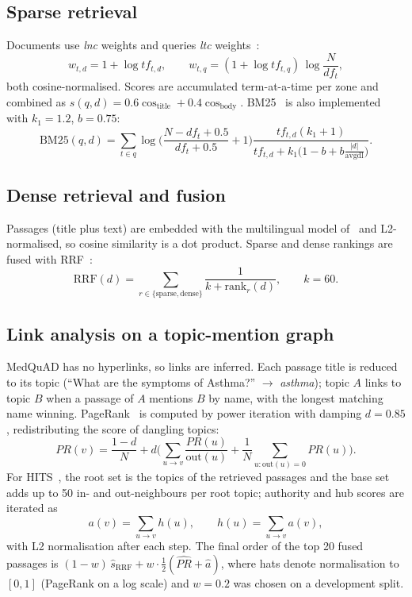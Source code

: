 \documentclass[conference]{IEEEtran}
\begin{document}
\subsection{Sparse retrieval}
Documents use \textit{lnc} weights and queries \textit{ltc} weights~\cite{manning2008}:
\begin{equation}
w_{t,d} = 1+\log tf_{t,d}, \qquad w_{t,q} = (1+\log tf_{t,q})\,\log\frac{N}{df_t},
\end{equation}
both cosine-normalised. Scores are accumulated term-at-a-time per zone and combined as $s(q,d)=0.6\cos_{\text{title}}+0.4\cos_{\text{body}}$. BM25~\cite{robertson2009} is also implemented with $k_1=1.2$, $b=0.75$:
\begin{equation}
\text{BM25}(q,d)=\sum_{t\in q}\log\!\Big(\frac{N-df_t+0.5}{df_t+0.5}+1\Big)\frac{tf_{t,d}(k_1+1)}{tf_{t,d}+k_1\big(1-b+b\frac{|d|}{\text{avgdl}}\big)}.
\end{equation}

\subsection{Dense retrieval and fusion}
Passages (title plus text) are embedded with the multilingual model of~\cite{reimers2020} and L2-normalised, so cosine similarity is a dot product. Sparse and dense rankings are fused with RRF~\cite{cormack2009}:
\begin{equation}
\text{RRF}(d)=\sum_{r\in\{\text{sparse},\text{dense}\}}\frac{1}{k+\text{rank}_r(d)},\qquad k=60.
\end{equation}

\subsection{Link analysis on a topic-mention graph}
MedQuAD has no hyperlinks, so links are inferred. Each passage title is reduced to its topic (``What are the symptoms of Asthma?'' $\to$ \textit{asthma}); topic $A$ links to topic $B$ when a passage of $A$ mentions $B$ by name, with the longest matching name winning. PageRank~\cite{page1999} is computed by power iteration with damping $d=0.85$, redistributing the score of dangling topics:
\begin{equation}
PR(v)=\frac{1-d}{N}+d\Big(\sum_{u\to v}\frac{PR(u)}{\text{out}(u)}+\frac{1}{N}\sum_{u:\text{out}(u)=0}PR(u)\Big).
\end{equation}
For HITS~\cite{kleinberg1999}, the root set is the topics of the retrieved passages and the base set adds up to 50 in- and out-neighbours per root topic; authority and hub scores are iterated as
\begin{equation}
a(v)=\sum_{u\to v}h(u),\qquad h(u)=\sum_{u\to v}a(v),
\end{equation}
with L2 normalisation after each step. The final order of the top 20 fused passages is $(1-w)\,\widehat{s}_{\text{RRF}}+w\cdot\tfrac12(\widehat{PR}+\widehat{a})$, where hats denote normalisation to $[0,1]$ (PageRank on a log scale) and $w=0.2$ was chosen on a development split.
\end{document}
